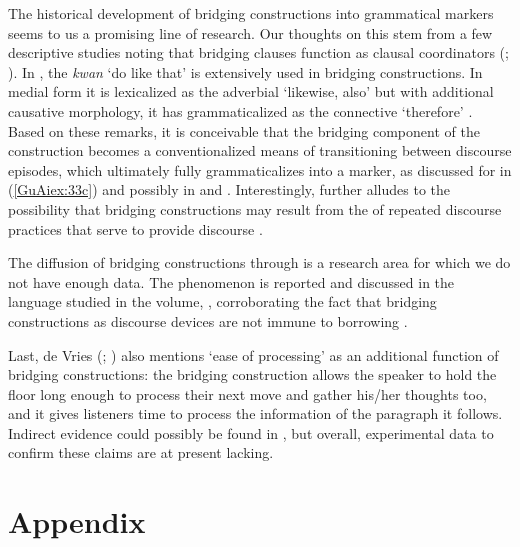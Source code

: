 \documentclass[output=paper]{LSP/langsci}
\begin{document}
The historical development of bridging constructions into grammatical markers seems to us a promising line of research. Our thoughts on this  stem from a few descriptive studies noting that bridging clauses function as clausal coordinators (\citealt[][314]{bromley81}; \citealt[][1327]{Jendraschek09}). In , the  \textit{kwan} `do like that' is extensively used in bridging constructions. In medial form it is lexicalized as the adverbial `likewise, also' but with additional causative morphology, it has grammaticalized as the connective `therefore' \citep[][29]{christensen13}. Based on these remarks, it is conceivable that the bridging component of the construction becomes a conventionalized means of transitioning between discourse episodes, which ultimately fully grammaticalizes into a  marker, as discussed for  in (\ref{GuAiex:33c}) and possibly in  \citep[][909, 913]{seifart10} and  \citep[][376--377]{devries.2005}. Interestingly, \citet{chapters/09Alvanoudi} further alludes to the possibility that bridging constructions may result from the  of repeated discourse practices that serve to provide discourse . 

The diffusion of bridging constructions through  is a research area for which we do not have enough data. The phenomenon is reported and discussed in the  language studied in the volume,  , corroborating the fact that bridging constructions as discourse devices are not immune to borrowing \citep[][15, 17]{aikhenvald2006}.                           

Last, de Vries (\citeyear[][378]{devries.2005}; \citeyear[][817]{devries.2006}) also mentions `ease of processing' as an additional function of bridging constructions: the bridging construction allows the speaker to hold the floor long enough to process their next  move and gather his/her thoughts too, and it gives listeners time to process the information of the paragraph it follows. Indirect evidence could possibly be found in  , but overall, experimental data to confirm these claims are at present lacking.

\section*{Appendix}
\end{document}

